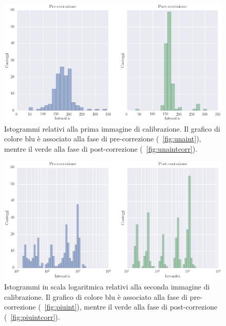 \begin{figure}
 \centering
 \includegraphics[scale=.60]{img/CAP4isto1.png}
 \caption{\small{Istogrammi relativi alla prima immagine di calibrazione. Il grafico di colore blu è associato alla fase di pre-correzione (\figurename~\ref{fig:unaint}), mentre il verde alla fase di post-correzione (\figurename~\ref{fig:unaintcorr}).}}
 \label{fig:isto1}
\end{figure}

\begin{figure}
 \centering
 \includegraphics[scale=.60]{img/CAP4isto2.png}
 \caption{\small{Istogrammi in scala logaritmica relativi alla seconda immagine di calibrazione. Il grafico di colore blu è associato alla fase di pre-correzione (\figurename~\ref{fig:piuint}), mentre il verde alla fase di post-correzione (\figurename~\ref{fig:piuintcorr}).}}
 \label{fig:isto2}
\end{figure}

